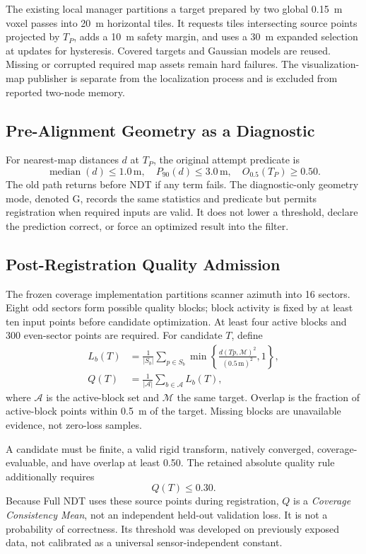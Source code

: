 \documentclass[journal,10pt,letterpaper]{IEEEtran}
\begin{document}
The existing local manager partitions a target prepared by two global 0.15~m voxel passes into 20~m horizontal tiles. It requests tiles intersecting source points projected by $T_P$, adds a 10~m safety margin, and uses a 30~m expanded selection at updates for hysteresis. Covered targets and Gaussian models are reused. Missing or corrupted required map assets remain hard failures. The visualization-map publisher is separate from the localization process and is excluded from reported two-node memory.

\subsection{Pre-Alignment Geometry as a Diagnostic}
For nearest-map distances $d$ at $T_P$, the original attempt predicate is
\begin{equation}
 \operatorname{median}(d)\leq 1.0\,\mathrm{m},\quad
 P_{90}(d)\leq3.0\,\mathrm{m},\quad O_{0.5}(T_P)\geq0.50.
 \label{eq:pregate}
\end{equation}
The old path returns before NDT if any term fails. The diagnostic-only geometry mode, denoted G, records the same statistics and predicate but permits registration when required inputs are valid. It does not lower a threshold, declare the prediction correct, or force an optimized result into the filter.

\subsection{Post-Registration Quality Admission}
The frozen coverage implementation partitions scanner azimuth into 16 sectors. Eight odd sectors form possible quality blocks; block activity is fixed by at least ten input points before candidate optimization. At least four active blocks and 300 even-sector points are required. For candidate $T$, define
\begin{align}
 L_b(T)&=\frac{1}{|S_b|}\sum_{p\in S_b}
 \min\!\left\{\frac{d(Tp,\mathcal M)^2}{(0.5\,\mathrm{m})^2},1\right\},
 \label{eq:block}\\
 Q(T)&=\frac{1}{|\mathcal A|}\sum_{b\in\mathcal A}L_b(T),
 \label{eq:quality}
\end{align}
where $\mathcal A$ is the active-block set and $\mathcal M$ the same target. Overlap is the fraction of active-block points within 0.5~m of the target. Missing blocks are unavailable evidence, not zero-loss samples.

A candidate must be finite, a valid rigid transform, natively converged, coverage-evaluable, and have overlap at least 0.50. The retained absolute quality rule additionally requires
\begin{equation}
 Q(T)\leq0.30.
 \label{eq:qgate}
\end{equation}
Because Full NDT uses these source points during registration, $Q$ is a \emph{Coverage Consistency Mean}, not an independent held-out validation loss. It is not a probability of correctness. Its threshold was developed on previously exposed data, not calibrated as a universal sensor-independent constant.
\end{document}
